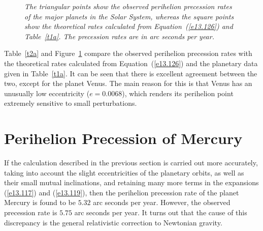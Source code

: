 \begin{figure}
\centerline{}
\caption{\em The triangular points show the observed perihelion precession rates of the
major planets in the Solar System, whereas the square points show the theoretical
rates calculated from Equation~(\ref{e13.126})
and Table~\ref{t1a}. The precession rates are in arc seconds per
year.}\label{fprec}
\end{figure}

Table~\ref{t2a} and Figure~\ref{fprec} compare the observed perihelion precession rates 
with the theoretical rates calculated from Equation~(\ref{e13.126})
and the planetary data given in Table~\ref{t1a}. It can be seen that there is excellent agreement
between the two, except for the planet Venus. The main reason for this is that Venus
has an unusually low eccentricity ($e=0.0068$), which renders its perihelion point extremely sensitive to small perturbations.

\section{Perihelion Precession of Mercury}\label{smerc}
If the calculation described in the previous section is carried out more accurately, taking into account the slight
eccentricities of the planetary orbits, as well as their small mutual inclinations, and retaining
many more terms in the expansions (\ref{e13.117}) and (\ref{e13.119}), then the perihelion
precession rate of the planet Mercury is found to be $5.32$ arc seconds per year. However, the
observed precession rate is $5.75$ arc seconds per year. It turns out that the
cause of this discrepancy is the general relativistic correction to Newtonian gravity.

